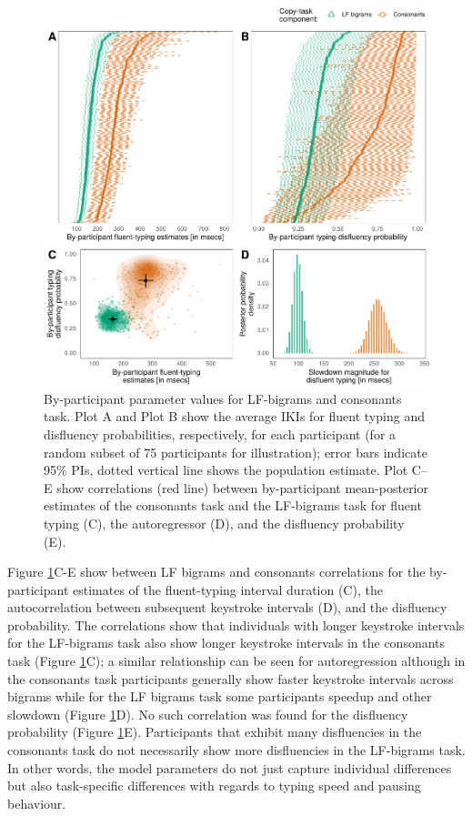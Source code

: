 \documentclass[
  english,
  man,mask,floatsintext]{apa7}
\begin{document}
\begin{landscape}
\begin{figure}[bp!]

{\centering \includegraphics{report_files/figure-latex/parameters-1} 

}

\caption{By-participant parameter values for LF-bigrams and consonants task. Plot A and Plot B show the average IKIs for fluent typing and disfluency probabilities, respectively, for each participant (for a random subset of 75 participants for illustration); error bars indicate 95\% PIs, dotted vertical line shows the population estimate. Plot C--E show correlations (red line) between by-participant mean-posterior estimates of the consonants task and the LF-bigrams task for fluent typing (C), the autoregressor (D), and the disfluency probability (E).}\label{fig:parameters}
\end{figure}
\end{landscape}

Figure \ref{fig:parameters}C-E show between LF bigrams and consonants correlations for the by-participant estimates of the fluent-typing interval duration (C), the autocorrelation between subsequent keystroke intervals (D), and the disfluency probability. The correlations show that individuals with longer keystroke intervals for the LF-bigrams task also show longer keystroke intervals in the consonants task (Figure \ref{fig:parameters}C); a similar relationship can be seen for autoregression although in the consonants task participants generally show faster keystroke intervals across bigrams while for the LF bigrams task some participants speedup and other slowdown (Figure \ref{fig:parameters}D). No such correlation was found for the disfluency probability (Figure \ref{fig:parameters}E). Participants that exhibit many disfluencies in the consonants task do not necessarily show more disfluencies in the LF-bigrams task. In other words, the model parameters do not just capture individual differences but also task-specific differences with regards to typing speed and pausing behaviour.
\end{document}
